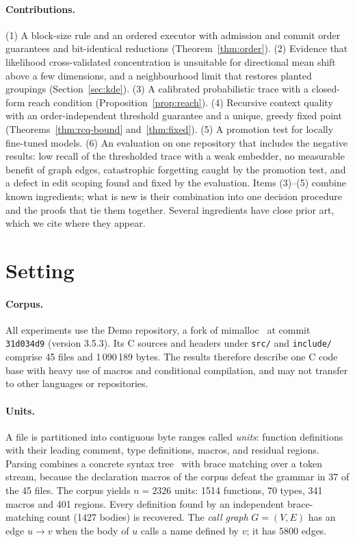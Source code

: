 \documentclass[10pt,twocolumn]{article}
\theoremstyle{definition}
\theoremstyle{remark}
\begin{document}
\paragraph{Contributions.}
(1) A block-size rule and an ordered executor with admission and commit order guarantees and bit-identical reductions (Theorem~\ref{thm:order}).
(2) Evidence that likelihood cross-validated concentration is unsuitable for directional mean shift above a few dimensions, and a neighbourhood limit that restores planted groupings (Section~\ref{sec:kde}).
(3) A calibrated probabilistic trace with a closed-form reach condition (Proposition~\ref{prop:reach}).
(4) Recursive context quality with an order-independent threshold guarantee and a unique, greedy fixed point (Theorems~\ref{thm:rcq-bound} and~\ref{thm:fixed}).
(5) A promotion test for locally fine-tuned models.
(6) An evaluation on one repository that includes the negative results: low recall of the thresholded trace with a weak embedder, no measurable benefit of graph edges, catastrophic forgetting caught by the promotion test, and a defect in edit scoping found and fixed by the evaluation.
Items (3)--(5) combine known ingredients; what is new is their combination into one decision procedure and the proofs that tie them together.
Several ingredients have close prior art, which we cite where they appear.

\section{Setting}\label{sec:setting}

\paragraph{Corpus.}
All experiments use the Demo repository, a fork of mimalloc~\cite{mimalloc} at commit \texttt{31d034d9} (version 3.5.3).
Its C sources and headers under \texttt{src/} and \texttt{include/} comprise 45 files and 1\,090\,189 bytes.
The results therefore describe one C code base with heavy use of macros and conditional compilation, and may not transfer to other languages or repositories.

\paragraph{Units.}
A file is partitioned into contiguous byte ranges called \emph{units}: function definitions with their leading comment, type definitions, macros, and residual regions.
Parsing combines a concrete syntax tree~\cite{treesitter_intro} with brace matching over a token stream, because the declaration macros of the corpus defeat the grammar in 37 of the 45 files.
The corpus yields $n=2326$ units: 1514 functions, 70 types, 341 macros and 401 regions.
Every definition found by an independent brace-matching count (1427 bodies) is recovered.
The \emph{call graph} $G=(V,E)$ has an edge $u\to v$ when the body of $u$ calls a name defined by $v$; it has 5800 edges.
\end{document}
